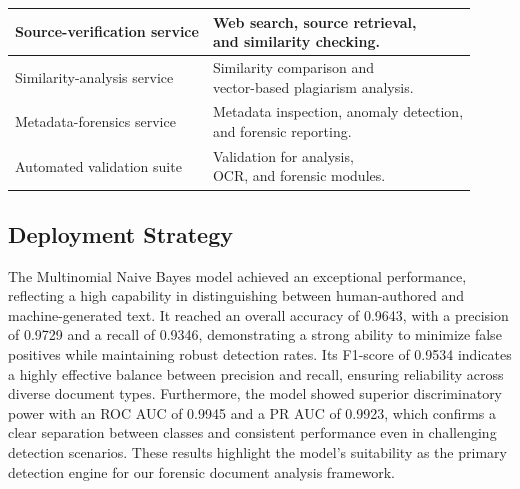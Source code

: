 \documentclass[12pt, a4paper]{report}
\numberwithin{equation}{chapter}
\begin{document}
\begin{table}[H]
\begin{tabularx}{\textwidth}{|>{\raggedright\arraybackslash}p{7.5cm}|X|}
        Source-verification service & \shortstack[l]{Web search, source retrieval,\\and similarity checking.} \\
        \hline

        Similarity-analysis service & \shortstack[l]{Similarity comparison and\\vector-based plagiarism analysis.} \\
        \hline

        Metadata-forensics service & \shortstack[l]{Metadata inspection, anomaly detection,\\and forensic reporting.} \\
        \hline

        Automated validation suite & \shortstack[l]{Validation for analysis,\\OCR, and forensic modules.} \\
        \hline
    \end{tabularx}
\end{table}
\FloatBarrier

\subsection{Deployment Strategy}
The Multinomial Naive Bayes model achieved an exceptional performance, reflecting 
a high capability in distinguishing between human-authored and machine-generated 
text. It reached an overall accuracy of 0.9643, with a precision of 0.9729 and a recall 
of 0.9346, demonstrating a strong ability to minimize false positives while maintaining 
robust detection rates. Its F1-score of 0.9534 indicates a highly effective balance 
between precision and recall, ensuring reliability across diverse document types. 
Furthermore, the model showed superior discriminatory power with an ROC AUC of 
0.9945 and a PR AUC of 0.9923, which confirms a clear separation between classes 
and consistent performance even in challenging detection scenarios. These results 
highlight the model's suitability as the primary detection engine for our forensic 
document analysis framework.
\end{document}
